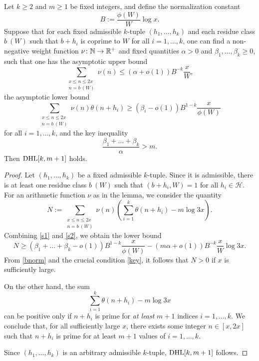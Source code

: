 \begin{lemma}\label{crit} Let $k \geq 2$ and $m \geq 1$ be fixed integers, and define the normalization constant
\begin{equation}\label{bnorm}
 B := \frac{\phi(W)}{W} \log x.
\end{equation}
Suppose that for each fixed admissible $k$-tuple $(h_1,\dots,h_k)$
  and each residue class $b\ (W)$ such that $b+h_i$ is coprime to $W$ for all $i=1,\dots,k$, one can find a non-negative weight
  function $\nu \colon \mathbb{N} \to \mathbb{R}^+$ and fixed quantities $\alpha > 0$ and $\beta_1,\dots,\beta_k \geq
  0$, such that one has the
  asymptotic upper bound
\begin{equation}\label{s1}
 \sum_{\substack{x \leq n \leq 2x\\ n = b\ (W)}} \nu(n) \leq (\alpha+o(1)) B^{-k} \frac{x}{W},
 \end{equation}
the asymptotic lower bound
\begin{equation}\label{s2}
  \sum_{\substack{x \leq n \leq 2x\\ n = b\ (W)}} \nu(n) \theta(n+h_i) \geq (\beta_i-o(1)) B^{1-k} \frac{x}{\phi(W)}
\end{equation}
for all $i=1,\dots,k$, and the key inequality
\begin{equation}\label{key}
\frac{\beta_1 + \dots + \beta_k}{\alpha} > m.
\end{equation}
Then $\operatorname*{DHL}[k,m+1]$ holds.
\end{lemma}

\begin{proof}
Let $(h_1,\ldots,h_{k})$ be a fixed
  admissible $k$-tuple.  Since it is admissible, there is at least
  one residue class $b\ (W)$ such that $(b+h_i,W)=1$ for all $h_i
  \in {\mathcal H}$.  For an arithmetic function $\nu$ as in the
  lemma, we consider the quantity
$$
N:=\sum_{\substack{x \leq n \leq 2x\\ n = b\ (W)}}
 \nu(n) \left(\sum_{i=1}^{k} \theta(n+h_i) - m\log 3x\right).
$$
Combining \eqref{s1} and \eqref{s2}, we obtain the lower bound
$$
N\geq (\beta_1+\dots+\beta_k-o(1)) B^{1-k} \frac{x}{\phi(W)} - (m\alpha+o(1)) B^{-k} \frac{x}{W} \log 3x.
$$
From \eqref{bnorm} and the crucial condition \eqref{key}, it follows that
$N>0$ if $x$ is sufficiently large.
\par
On the other hand, the sum
$$
\sum_{i=1}^{k} \theta(n+h_i) - m\log 3x
$$
can  be positive only if $n+h_i$ is prime for \emph{at least} $m+1$
indices $i=1, \ldots, k$.  We conclude that, for all sufficiently
large $x$, there exists some integer $n \in [x,2x]$ such that $n+h_i$
is prime for at least $m+1$ values of $i=1,\ldots,k$.
\par
Since $(h_1,\dots,h_k)$ is an arbitrary admissible $k$-tuple,
$\operatorname*{DHL}[k,m+1]$ follows.
\end{proof}

